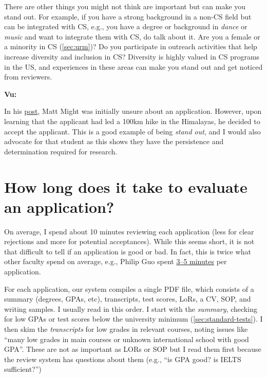 \documentclass[oneside,11pt,dvipsnames]{book}
\newenvironment{commentbox}[1][]{
  \small
  \begin{mybox}
    {\small \textbf{#1}}
  }{
  \end{mybox}
}
\def\sectioninfo#1{%
  \addcontentsline{toc}{sectioninfo}{%
    \noexpand\numberline{}\color{black}{#1}}%
}
\begin{document}
There are other things you might not think are important but can make you stand out. For example, if you have a strong background in a non-CS field but can be integrated with CS, e.g., you have a degree or background in \emph{dance} or \emph{music} and want to integrate them with CS, do talk about it. Are you a female or a minority in CS (\autoref{sec:urm})? Do you participate in outreach activities that help increase diversity and inclusion in CS? Diversity is highly valued in CS programs in the US, and experiences in these areas can make you stand out and get noticed from reviewers.

\begin{commentbox}[Vu:]
In his \href{https://matt.might.net/articles/how-to-apply-and-get-in-to-graduate-school-in-science-mathematics-engineering-or-computer-science/}{post}, Matt Might was initially unsure about an application. However, upon learning that the applicant had led a 100km hike in the Himalayas, he decided to accept the applicant.  This is a good example of being \emph{stand out}, and I would also advocate for that student as this shows they have the persistence and determination required for research.
\end{commentbox}


\section{How long does it take to evaluate an application?}\label{sec:ievaluate}
\sectioninfo{It takes me about 10 minutes to review an application.}

On average, I spend about 10 minutes reviewing each application (less for clear rejections and more for potential acceptances). While this seems short, it is not that difficult to tell if an application is good or bad.  In fact, this
is twice what other faculty spend on average, e.g., Philip Guo spent \href{https://pg.ucsd.edu/PhD-application-tips.htm}{3--5 minutes} per application.

For each application, our system compiles a single PDF file, which consists of a summary (degrees, GPAs, etc), transcripts, test scores, LoRs, a CV, SOP, and writing samples. I usually read in this order. I start with the \emph{summary}, checking for low GPAs or test scores below the university minimum (\autoref{sec:standard-tests}). I then skim the \emph{transcripts} for low grades in relevant courses, noting issues like ``many low grades in main courses or unknown international school with good GPA''.  These are not as important as LORs or SOP but I read them first because the review system has questions about them (e.g., ``is GPA good? is IELTS sufficient?'')
\end{document}
